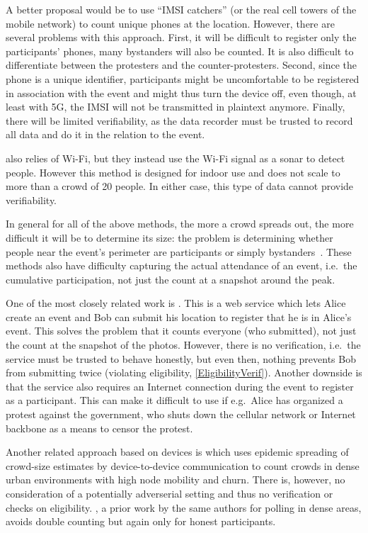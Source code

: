 A better proposal would be to use \enquote{IMSI catchers} (or the real cell 
towers of the mobile network) to count unique phones at the location.
However, there are several problems with this approach.
First, it will be difficult to register only the participants' phones, many 
bystanders will also be counted.
It is also difficult to differentiate between the protesters and the 
counter-protesters.
Second, since the phone is a unique identifier, participants might be 
uncomfortable to be registered in association with the event and might thus 
turn the device off, even though, at least with 5G, the IMSI will not be
transmitted in plaintext anymore. %
Finally, there will be limited verifiability, as the data recorder must be 
trusted to record all data and do it in the relation to the event.

 also relies of Wi-Fi, but they instead use the Wi-Fi 
signal as a sonar to detect people.
However this method is designed for indoor use and does not scale to more than 
a crowd of 20 people.
In either case, this type of data cannot provide verifiability.

In general for all of the above methods, the more a crowd spreads out, the more
difficult it will be to determine its size:
the problem is determining whether people near the event's perimeter are 
participants or simply bystanders~\cite{HowToEstimateCrowdSize}.
These methods also have difficulty capturing the actual attendance of an event,
i.e.\ the cumulative participation, not just the count at a snapshot around the 
peak.

One of the most closely related work is \citet{CrowdCount}.
This is a web service which lets Alice create an event and Bob can submit his 
location to register that he is in Alice's event.
This solves the problem that it counts everyone (who submitted), not just the 
count at the snapshot of the photos.
However, there is no verification, i.e.\ the service must be trusted to behave 
honestly, but even then, nothing prevents Bob from submitting twice (violating 
eligibility, \cref{EligibilityVerif}).
Another downside is that the service also requires an Internet connection 
during the event to register as a participant.
This can make it difficult to use if e.g.\ Alice has organized a protest 
against the government, who shuts down the cellular network or Internet 
backbone as a means to censor the protest.

Another related approach based on devices is \citet{UrbanCount} which
uses epidemic spreading of crowd-size estimates by device-to-device
communication to count crowds in dense urban environments with high
node mobility and churn. There is, however, no consideration of a potentially
adverserial setting and thus no verification or checks on
eligibility. \citet{DiVote}, a prior work by the same authors for
polling in dense areas, avoids double counting but again only for
honest participants.

